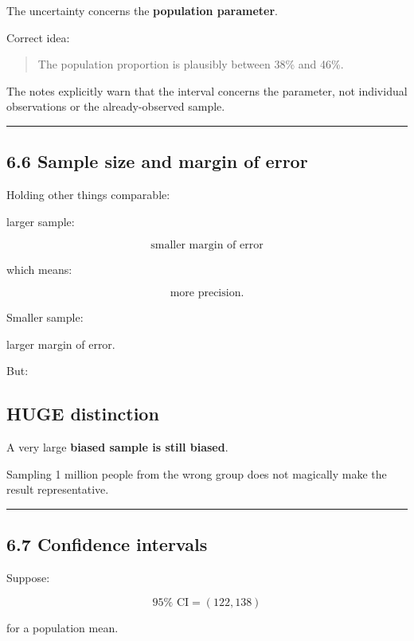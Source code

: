 \documentclass[
]{article}
\begin{document}
The uncertainty concerns the \textbf{population parameter}.

Correct idea:

\begin{quote}
The population proportion is plausibly between 38\% and 46\%.
\end{quote}

The notes explicitly warn that the interval concerns the parameter, not
individual observations or the already-observed sample.

\begin{center}\rule{0.5\linewidth}{0.5pt}\end{center}

\subsection{6.6 Sample size and margin of
error}\label{sample-size-and-margin-of-error}

Holding other things comparable:

larger sample:

\[
\boxed{\text{smaller margin of error}}
\]

which means:

\[
\boxed{\text{more precision}}.
\]

Smaller sample:

larger margin of error.

But:

\subsection{HUGE distinction}\label{huge-distinction}

A very large \textbf{biased sample is still biased}.

Sampling 1 million people from the wrong group does not magically make
the result representative.

\begin{center}\rule{0.5\linewidth}{0.5pt}\end{center}

\subsection{6.7 Confidence intervals}\label{confidence-intervals}

Suppose:

\[
95\%\text{ CI}=(122,138)
\]

for a population mean.
\end{document}
